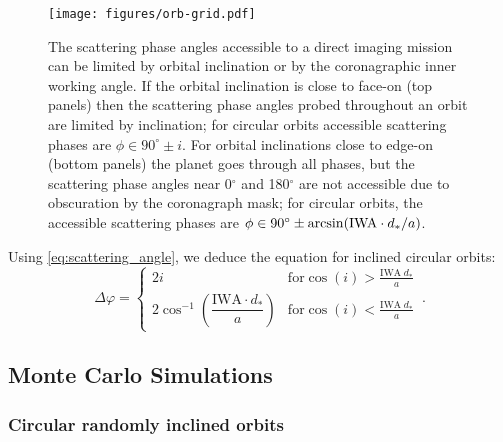 \documentclass[
    usenatbib,
]{mnras}
\begin{document}
\begin{figure}%
   \centering
   \texttt{[image: figures/orb-grid.pdf]}
   \caption{
        The scattering phase angles accessible to a direct imaging mission can be limited by orbital inclination or by the coronagraphic inner working angle.
        If the orbital inclination is close to face-on (top panels) then the scattering phase angles probed throughout an orbit are limited by inclination; for circular orbits accessible scattering phases are $\phi \in 90^\circ \pm i$. 
        For orbital inclinations close to edge-on (bottom panels) the planet goes through all phases, but the scattering phase angles near 0$^\circ$ and 180$^\circ$ are not accessible due to obscuration by the coronagraph mask; for circular orbits, the accessible scattering phases are $\phi \in 90^\circ \pm \arcsin({\rm IWA}\cdot d_*/a)$.
    }
    \label{fig:orb-grid}
\end{figure}

Using \cref{eq:scattering_angle}, we deduce the equation for inclined circular orbits: 
\begin{equation}
\label{eq:Delta_phi_max}
    \Delta \varphi = 
    \begin{cases}
        2 i & \textrm{for} \cos(i) > \frac{\mathrm{IWA}\; d_* }{a}
  \\ 
        2  \cos^{-1}\left(\dfrac{\mathrm{IWA}\cdot d_* }{a}\right)  & \textrm{for} \cos(i) < \frac{\mathrm{IWA}\; d_* }{a}
    \end{cases}\,.
\end{equation}





\subsection{Monte Carlo Simulations}

\subsubsection{Circular randomly inclined orbits}
\label{sec:circular}
\end{document}
